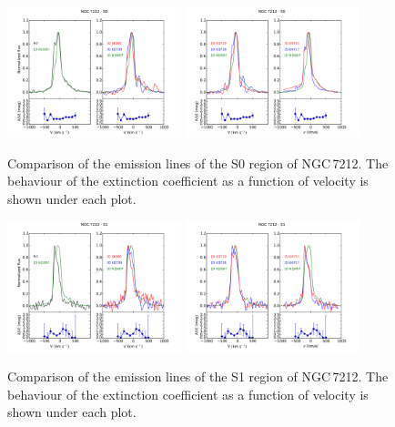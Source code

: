 \documentclass[../main.tex]{subfiles}
\begin{document}
\begin{figure}
\centering
\includegraphics[width=0.45\textwidth]{images/paper1/NGC7212_s0_l1.pdf} \quad
\includegraphics[width=0.45\textwidth]{images/paper1/NGC7212_s0_l2.pdf}\\
\caption[]{Comparison of the emission lines of the S0 region of NGC\,7212. The behaviour of the extinction coefficient as a function of velocity is shown under each plot.}
\label{fig:s0l1_N}
\end{figure}

\begin{figure}
\centering
\includegraphics[width=0.45\textwidth]{images/paper1/NGC7212_s1_l1.pdf} \quad
\includegraphics[width=0.45\textwidth]{images/paper1/NGC7212_s1_l2.pdf}\\
\caption[]{Comparison of the emission lines of the S1 region of NGC\,7212. The behaviour of the extinction coefficient as a function of velocity is shown under each plot.}
\label{fig:s1l1_N}
\end{figure}
\end{document}
